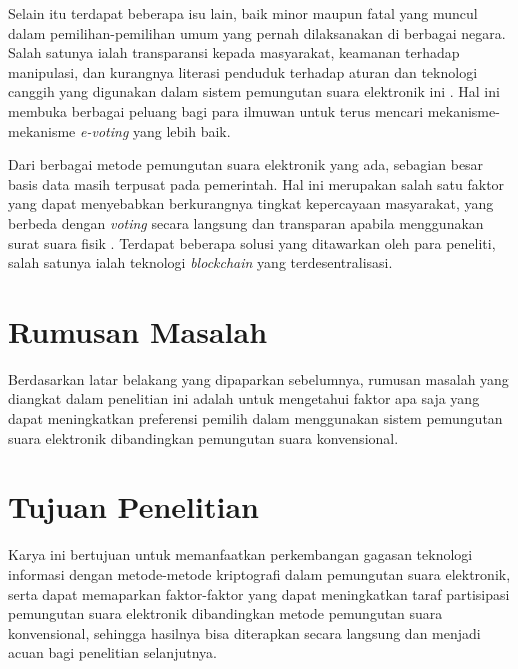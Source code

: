 Selain itu terdapat beberapa isu lain, baik minor maupun fatal yang muncul dalam pemilihan-pemilihan umum yang pernah dilaksanakan di berbagai negara. Salah satunya ialah transparansi kepada masyarakat, keamanan terhadap manipulasi, dan kurangnya literasi penduduk terhadap aturan dan teknologi canggih yang digunakan dalam sistem pemungutan suara elektronik ini \citep{7001136}. Hal ini membuka berbagai peluang bagi para ilmuwan untuk terus mencari mekanisme-mekanisme \textit{e-voting} yang lebih baik.

Dari berbagai metode pemungutan suara elektronik yang ada, sebagian besar basis data masih terpusat pada pemerintah. Hal ini merupakan salah satu faktor yang dapat menyebabkan berkurangnya tingkat kepercayaan masyarakat, yang berbeda dengan \textit{voting} secara langsung dan transparan apabila menggunakan surat suara fisik \citep{8651451}. Terdapat beberapa solusi yang ditawarkan oleh para peneliti, salah satunya ialah teknologi \textit{blockchain} yang terdesentralisasi.

\section{Rumusan Masalah}
Berdasarkan latar belakang yang dipaparkan sebelumnya, rumusan masalah yang diangkat dalam penelitian ini adalah untuk mengetahui faktor apa saja yang dapat meningkatkan preferensi pemilih dalam menggunakan sistem pemungutan suara elektronik dibandingkan pemungutan suara konvensional.

\section{Tujuan Penelitian}
Karya ini bertujuan untuk memanfaatkan perkembangan gagasan teknologi informasi dengan metode-metode kriptografi dalam pemungutan suara elektronik, serta dapat memaparkan faktor-faktor yang dapat meningkatkan taraf partisipasi pemungutan suara elektronik dibandingkan metode pemungutan suara konvensional, sehingga hasilnya bisa diterapkan secara langsung dan menjadi acuan bagi penelitian selanjutnya.

